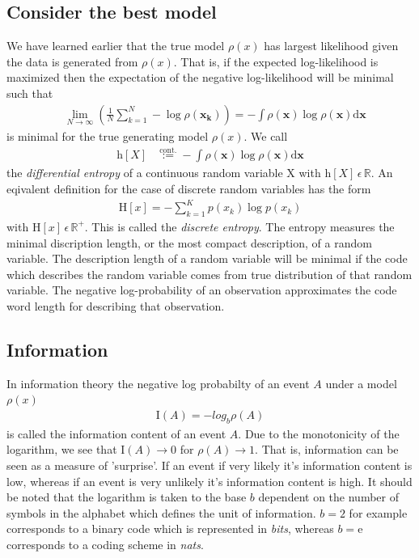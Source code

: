 \subsection{Consider the best model}
We have learned earlier that the true model $\rho(x)$ has largest likelihood 
given the data is generated from $\rho(x)$. That is, if the expected log-likelihood is maximized
then the expectation of the negative log-likelihood will be minimal such that
\begin{align}
   &\lim_{N \rightarrow \infty} \left( \frac{1}{N} \sum_{k = 1}^N -\log \rho(\mathbf{x_k}) \right)
   = - \int \rho (\mathbf{x}) \log \rho(\mathbf{x}) \mathrm{d}\mathbf{x} 
\end{align}   
is minimal for the true generating model $\rho(x)$. We call 
\begin{align}
	  \mathrm{h}[X] &\stackrel{\text{cont.}}{:=} - \int \rho (\mathbf{x}) \log \rho(\mathbf{x}) \mathrm{d}\mathbf{x}
\end{align}
the \emph{differential entropy} of a continuous random variable X with 
$\mathrm{h}[X] \, \epsilon \, \mathbb{R}$. An eqivalent definition for the case of discrete 
random variables has the form
\begin{align}
	\mathrm{H}[x] = - \sum_{k=1}^K p(x_k) \log p(x_k)
\end{align}
with $\mathrm{H}[x] \, \epsilon \, \mathbb{R}^+$. This is called the \emph{discrete entropy}.
The entropy measures the minimal discription length, or the most compact description, of a random
variable. The description length of a random variable will be minimal if the code which describes
the random variable comes from true distribution of that random variable. The negative log-probability
of an observation approximates the code word length for describing that observation.

\subsection{Information}
In information theory the negative log probabilty of an event $A$ under a model $\rho(x)$
	\begin{align}
		\mathrm{I}(A) = -log_b\rho(A)
	\end{align}
is called the information content of an event $A$. Due to the monotonicity of the logarithm,
we see that $\mathrm{I}(A) \rightarrow 0$ for $\rho(A) \rightarrow 1$. That is, information can be seen
as a measure of 'surprise'. If an event if very likely it's information content is low, whereas
if an event is very unlikely it's information content is  high.
It should be noted that the logarithm is taken to the
base $b$ dependent on the number of symbols in the alphabet which defines the unit of information. 
$b = 2$ for example corresponds to a binary code which is represented in \emph{bits}, whereas
$b = \mathrm{e}$ corresponds to a coding scheme in \emph{nats}.

